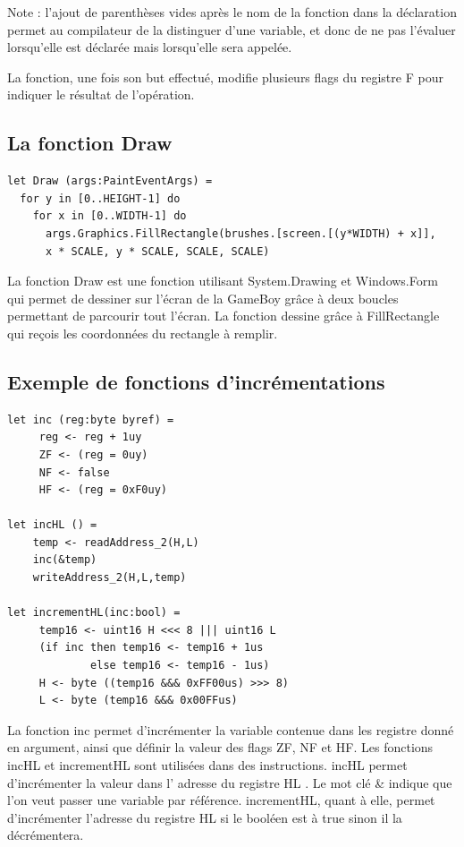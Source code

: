 \documentclass[12pt, a4paper]{article}
\begin{document}
\bigskip
\large

Note : l'ajout de parenthèses vides après le nom de la fonction dans la déclaration permet au compilateur de la distinguer d'une variable, et donc de ne pas l'évaluer lorsqu'elle est déclarée mais lorsqu'elle sera appelée.

\bigskip
La fonction, une fois son but effectué, modifie plusieurs flags du registre F pour indiquer le résultat de l'opération.

\pagebreak
\subsection{La fonction Draw}
\small \begin{lstlisting}[frame=single]
let Draw (args:PaintEventArgs) =
  for y in [0..HEIGHT-1] do
    for x in [0..WIDTH-1] do
      args.Graphics.FillRectangle(brushes.[screen.[(y*WIDTH) + x]],
      x * SCALE, y * SCALE, SCALE, SCALE)
\end{lstlisting}
\large
La fonction Draw est une fonction utilisant System.Drawing et Windows.Form qui permet de dessiner sur l'écran de la GameBoy grâce à deux boucles permettant de parcourir tout l'écran. La fonction dessine grâce à FillRectangle qui reçois les coordonnées du rectangle à remplir.

\bigskip

\subsection{Exemple de fonctions d'incrémentations}
\small { \begin{lstlisting}[frame = single]
let inc (reg:byte byref) =
     reg <- reg + 1uy
     ZF <- (reg = 0uy) 
     NF <- false
     HF <- (reg = 0xF0uy)
     
let incHL () =
    temp <- readAddress_2(H,L)
    inc(&temp) 
    writeAddress_2(H,L,temp)

let incrementHL(inc:bool) =
     temp16 <- uint16 H <<< 8 ||| uint16 L 
     (if inc then temp16 <- temp16 + 1us 
             else temp16 <- temp16 - 1us)
     H <- byte ((temp16 &&& 0xFF00us) >>> 8) 
     L <- byte (temp16 &&& 0x00FFus)
\end{lstlisting}} 
\bigskip

\pagebreak
\large
La fonction inc permet d'incrémenter la variable contenue dans les registre donné en argument, ainsi que définir la valeur des flags ZF, NF et HF. 
Les fonctions incHL et incrementHL sont utilisées dans des instructions.
incHL permet d'incrémenter la valeur dans l' adresse du registre HL . Le mot clé \& indique que l'on veut passer une variable par référence. incrementHL, quant à elle, permet d'incrémenter l'adresse du registre HL si le booléen est à true sinon il la décrémentera.
\end{document}
